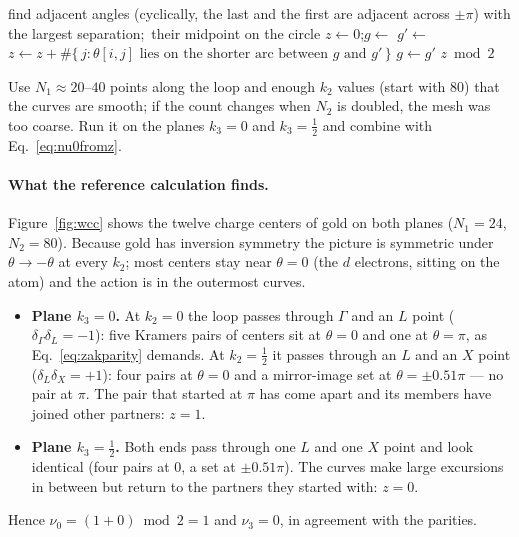 \begin{algorithm}[H]
\caption{Counting partner switches by following the largest gap}
\label{alg:count}
\begin{algorithmic}[1]
 
\State find adjacent angles (cyclically, the last and the first are
adjacent across $\pm\pi$) with the largest separation;\ \Return their
midpoint on the circle
\EndFunction
\State $z \gets 0$;\quad $g \gets$ 
\State $g' \gets$ 
\State $z \gets z + \#\{\,j : \theta[i,j] \text{ lies on the shorter arc
between } g \text{ and } g'\,\}$
\State $g \gets g'$
\EndFor
\State \Return $z \bmod 2$
\EndFunction
\end{algorithmic}
\end{algorithm}

Use $N_1 \approx 20$--$40$ points along the loop and enough $k_2$ values
(start with 80) that the curves are smooth; if the count changes when
$N_2$ is doubled, the mesh was too coarse. Run it on the planes $k_3 = 0$
and $k_3 = \tfrac12$ and combine with Eq.~\eqref{eq:nu0fromz}.

\paragraph{What the reference calculation finds.} Figure~\ref{fig:wcc}
shows the twelve charge centers of gold on both planes ($N_1 = 24$,
$N_2 = 80$). Because gold has inversion symmetry the picture is symmetric
under $\theta\to-\theta$ at every $k_2$; most centers stay near
$\theta = 0$ (the $d$ electrons, sitting on the atom) and the action is in
the outermost curves.
\begin{itemize}[leftmargin=2em]
\item \textbf{Plane $k_3 = 0$.} At $k_2 = 0$ the loop passes through
$\Gamma$ and an $L$ point ($\delta_\Gamma\delta_L = -1$): five Kramers
pairs of centers sit at $\theta = 0$ and one at $\theta = \pi$, as
Eq.~\eqref{eq:zakparity} demands. At $k_2 = \tfrac12$ it passes through an
$L$ and an $X$ point ($\delta_L\delta_X = +1$): four pairs at $\theta = 0$
and a mirror-image set at $\theta = \pm0.51\pi$ --- no pair at $\pi$. The
pair that started at $\pi$ has come apart and its members have joined
other partners: $z = 1$.
\item \textbf{Plane $k_3 = \tfrac12$.} Both ends pass through one $L$ and
one $X$ point and look identical (four pairs at $0$, a set at
$\pm0.51\pi$). The curves make large excursions in between but return to
the partners they started with: $z = 0$.
\end{itemize}
Hence $\nu_0 = (1+0) \bmod 2 = 1$ and $\nu_3 = 0$, in agreement with the
parities.

